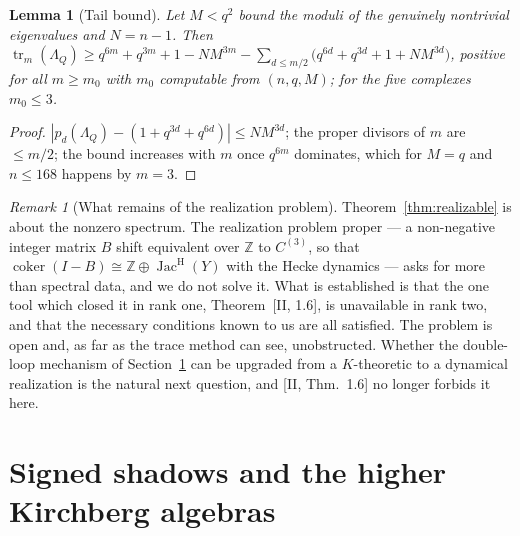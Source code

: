\documentclass[11pt]{amsart}
\numberwithin{equation}{section}
\newtheorem{lemma}[theorem]{Lemma}
\theoremstyle{definition}
\theoremstyle{remark}
\newtheorem{remark}[theorem]{Remark}
\newcommand{\Z}{\mathbb{Z}}
\newcommand{\Jac}{\operatorname{Jac}}
\newcommand{\coker}{\operatorname{coker}}
\newcommand{\tr}{\operatorname{tr}}
\newcommand{\JacH}{\Jac^{\mathrm{H}}}
\newcommand{\Cthree}{C^{(3)}}
\begin{document}
\begin{lemma}[Tail bound]\label{lem:bound}
Let $M<q^{2}$ bound the moduli of the genuinely nontrivial eigenvalues and $N=n-1$. Then
$\tr_m(\Lambda_Q)\ge q^{6m}+q^{3m}+1-NM^{3m}-\sum_{d\le m/2}\bigl(q^{6d}+q^{3d}+1+NM^{3d}\bigr)$,
positive for all $m\ge m_0$ with $m_0$ computable from $(n,q,M)$; for the five complexes
$m_0\le3$.
\end{lemma}

\begin{proof}
$|p_d(\Lambda_Q)-(1+q^{3d}+q^{6d})|\le NM^{3d}$; the proper divisors of $m$ are $\le m/2$; the
bound increases with $m$ once $q^{6m}$ dominates, which for $M=q$ and $n\le168$ happens by
$m=3$.
\end{proof}

\begin{remark}[What remains of the realization problem]\label{rem:realization}
Theorem~\ref{thm:realizable} is about the nonzero spectrum. The realization problem proper
--- a non-negative integer matrix $B$ shift equivalent over $\Z$ to $\Cthree$, so that
$\coker(I-B)\cong\Z\oplus\JacH(Y)$ with the Hecke dynamics --- asks for more than spectral
data, and we do not solve it. What is established is that the one tool which closed it in
rank one, Theorem~[II, 1.6], is unavailable in rank two, and that the necessary conditions
known to us are all satisfied. The problem is open and, as far as the trace method can see,
unobstructed. Whether the double-loop mechanism of Section~\ref{sec:shadow} can be upgraded
from a $K$-theoretic to a dynamical realization is the natural next question, and [II,
Thm.~1.6] no longer forbids it here.
\end{remark}

\section{Signed shadows and the higher Kirchberg algebras}\label{sec:shadow}
\end{document}
